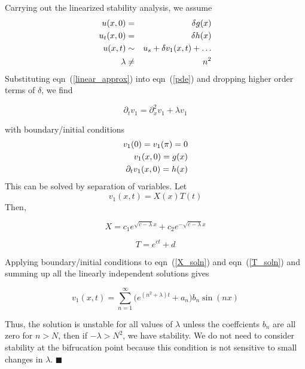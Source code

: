 \documentclass[11pt]{article}
\newcommand{\eqn}[2]{
  \begin{equation}
    \label{#1}
    #2
  \end{equation}
}
\newcommand{\lam}{\lambda}
\newcommand{\eqr}[1]{eqn~(\ref{#1})}
\newcommand{\p}[1]{\partial_{#1}}
\begin{document}
\begin{description}
Carrying out the linearized stability analysis, we assume
\begin{eqnarray}
  u(x,0) &=& \delta g(x) \notag \\
  u_t(x,0) &=& \delta h(x) \notag \\
  u(x,t) &\sim& u_s + \delta v_1(x, t) + \ldots \label{linear_approx}\\
  \lambda &\neq& n^2 \notag
\end{eqnarray}
Substituting \eqr{linear_approx} into \eqr{pde} and dropping higher order terms of $\delta$, we find
\eqn{v1_eqn}{
  \p{t}v_1
  =
  \p{x}^2 v_1 + \lambda v_1
}
with boundary/initial conditions
\begin{eqnarray}
  v_1(0) = v_1(\pi) = 0 \notag \\
  v_1(x,0) = g(x) \notag \\
  \p{t} v_1(x,0) = h(x) \notag
\end{eqnarray}
This can be solved by separation of variables. Let
$$
 v_1(x,t) = X(x)T(t)
$$
Then,
\eqn{X_soln}{
  X =
  c_1 e^{\sqrt{c - \lambda} x}
  + c_2 e^{-\sqrt{c - \lambda} x}
}
\eqn{T_soln}{
  T = e^{ct} + d
}
Applying boundary/initial conditions to \eqr{X_soln} and \eqr{T_soln}
and summing up all the linearly independent solutions gives
\eqn{v1_soln}{
  v_1(x,t) = \sum_{n=1}^\infty
  \bigg(
    e^{(n^2 + \lambda) t} + a_n
  \bigg)
  b_n \sin(nx)
}
Thus, the solution is unstable for all values of $\lambda$ unless the coeffcients
$b_n$ are all zero for $n > N$, then if $-\lam > N^2$, we have stability. We do not
need to consider stability at the bifrucation point because this condition is not
sensitive to small changes in $\lam$.
\hfill $\blacksquare$
\end{description}
\end{document}
